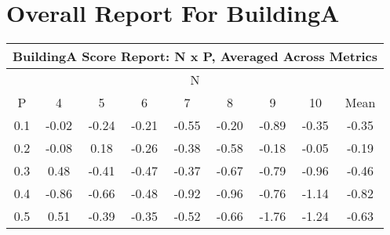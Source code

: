\documentclass[11pt,a4paper]{report}
\begin{document}
\chapter{Overall Report For BuildingA}
\begin{longtable}{ | c || c | c | c | c | c | c | c || c |}
\hline
\multicolumn{9}{|c|}{ BuildingA Score Report: N x P, Averaged Across Metrics } \\
\hline
\multicolumn{9}{|c|}{ N } \\
\hline
P & 4 & 5 & 6 & 7 & 8 & 9 & 10 & Mean\\
\hline
\hline
\endhead
0.1 &  \cellcolor[HTML]{FFFFFF} -0.02 &  \cellcolor[HTML]{FFF7F7} -0.24 &  \cellcolor[HTML]{FFF7F7} -0.21 &  \cellcolor[HTML]{FFEFEF} -0.55 &  \cellcolor[HTML]{FFF7F7} -0.20 &  \cellcolor[HTML]{FFE7E7} -0.89 &  \cellcolor[HTML]{FFF7F7} -0.35 &  \cellcolor[HTML]{FFF7F7} -0.35 \\
0.2 &  \cellcolor[HTML]{FFFFFF} -0.08 &  \cellcolor[HTML]{F7F7FF} 0.18 &  \cellcolor[HTML]{FFF7F7} -0.26 &  \cellcolor[HTML]{FFF7F7} -0.38 &  \cellcolor[HTML]{FFEFEF} -0.58 &  \cellcolor[HTML]{FFF7F7} -0.18 &  \cellcolor[HTML]{FFFFFF} -0.05 &  \cellcolor[HTML]{FFF7F7} -0.19 \\
0.3 &  \cellcolor[HTML]{F7F7FF} 0.48 &  \cellcolor[HTML]{FFF7F7} -0.41 &  \cellcolor[HTML]{FFF7F7} -0.47 &  \cellcolor[HTML]{FFF7F7} -0.37 &  \cellcolor[HTML]{FFEFEF} -0.67 &  \cellcolor[HTML]{FFEFEF} -0.79 &  \cellcolor[HTML]{FFE7E7} -0.96 &  \cellcolor[HTML]{FFF7F7} -0.46 \\
0.4 &  \cellcolor[HTML]{FFE7E7} -0.86 &  \cellcolor[HTML]{FFEFEF} -0.66 &  \cellcolor[HTML]{FFEFEF} -0.48 &  \cellcolor[HTML]{FFE7E7} -0.92 &  \cellcolor[HTML]{FFE7E7} -0.96 &  \cellcolor[HTML]{FFEFEF} -0.76 &  \cellcolor[HTML]{FFDFDF} -1.14 &  \cellcolor[HTML]{FFE7E7} -0.82 \\
0.5 &  \cellcolor[HTML]{EFEFFF} 0.51 &  \cellcolor[HTML]{FFF7F7} -0.39 &  \cellcolor[HTML]{FFF7F7} -0.35 &  \cellcolor[HTML]{FFEFEF} -0.52 &  \cellcolor[HTML]{FFEFEF} -0.66 &  \cellcolor[HTML]{FFCFCF} -1.76 &  \cellcolor[HTML]{FFDFDF} -1.24 &  \cellcolor[HTML]{FFEFEF} -0.63 \\

\end{longtable}
\end{document}
